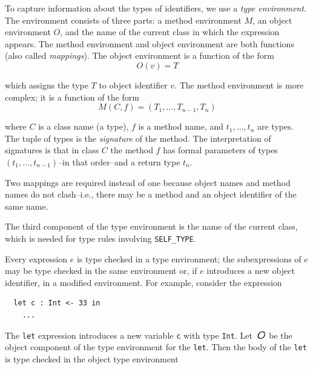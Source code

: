 \documentclass[]{article}
\begin{document}
To capture information about the types of identifiers, we use a
\emph{type environment}. The environment consists of three parts: a
method environment $M$, an object environment $O$, and the name of the
current class in which the expression appears. The method environment
and object environment are both functions (also called \emph{mappings}).
The object environment is a function of the form \\

\begin{displaymath}O(v) = T \end{displaymath}

which assigns the type $ T$ to object identifier $ v$. The method
environment is more complex; it is a function of the form \\

\begin{displaymath}M(C,f) = (T_1,\ldots,T_{n-1},T_n) \end{displaymath}

where $ C$ is a class name (a type), $f$ is a method name, and
$ t_1,\ldots,t_n$ are types. The tuple of types is the \emph{signature}
of the method. The interpretation of signatures is that in class $ C$
the method $f$ has formal parameters of types
$ (t_1,\ldots,t_{n-1})$--in that order--and a return type $t_n$.

Two mappings are required instead of one because object names and method
names do not clash--i.e., there may be a method and an object identifier
of the same name.

The third component of the type environment is the name of the current
class, which is needed for type rules involving \texttt{SELF\_TYPE}.

Every expression $e$ is type checked in a type environment; the
subexpressions of $e$ may be type checked in the same environment or, if
$e$ introduces a new object identifier, in a modified environment. For
example, consider the expression

\begin{verbatim}
  let c : Int <- 33 in
    ...
\end{verbatim}

The \texttt{let} expression introduces a new variable \texttt{c} with
type \texttt{Int}. Let \includegraphics{img56.png} be the object
component of the type environment for the \texttt{let}. Then the body of
the \texttt{let} is type checked in the object type environment \\
\end{document}
